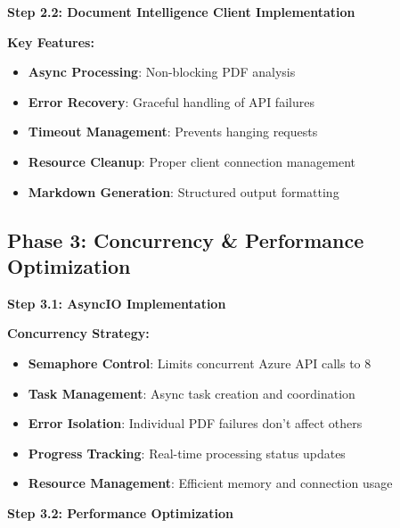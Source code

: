\documentclass[11pt]{article}
\begin{document}
\begin{stepbox}
\textbf{Step 2.2: Document Intelligence Client Implementation}
\end{stepbox}

\begin{techbox}
\textbf{Key Features:}
\begin{itemize}
    \item \textbf{Async Processing}: Non-blocking PDF analysis
    \item \textbf{Error Recovery}: Graceful handling of API failures
    \item \textbf{Timeout Management}: Prevents hanging requests
    \item \textbf{Resource Cleanup}: Proper client connection management
    \item \textbf{Markdown Generation}: Structured output formatting
\end{itemize}
\end{techbox}

\subsection*{Phase 3: Concurrency \& Performance Optimization}

\begin{stepbox}
\textbf{Step 3.1: AsyncIO Implementation}
\end{stepbox}

\begin{techbox}
\textbf{Concurrency Strategy:}
\begin{itemize}
    \item \textbf{Semaphore Control}: Limits concurrent Azure API calls to 8
    \item \textbf{Task Management}: Async task creation and coordination
    \item \textbf{Error Isolation}: Individual PDF failures don't affect others
    \item \textbf{Progress Tracking}: Real-time processing status updates
    \item \textbf{Resource Management}: Efficient memory and connection usage
\end{itemize}
\end{techbox}

\begin{stepbox}
\textbf{Step 3.2: Performance Optimization}
\end{stepbox}
\end{document}
